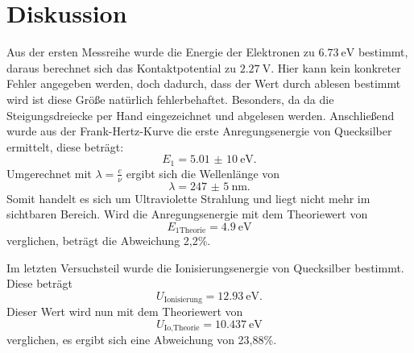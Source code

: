 \section{Diskussion}
\label{sec:Diskussion}
Aus der ersten Messreihe wurde die Energie der Elektronen zu
$\SI{6,73}{\eV}$ bestimmt, daraus berechnet sich das
Kontaktpotential zu $\SI{2,27}{\V}$.
Hier kann kein konkreter Fehler angegeben werden, doch dadurch, dass der Wert durch
ablesen bestimmt wird ist diese Größe natürlich fehlerbehaftet. Besonders, da
da die Steigungsdreiecke per Hand eingezeichnet und abgelesen werden.
Anschließend wurde aus der Frank-Hertz-Kurve die erste Anregungsenergie
von Quecksilber ermittelt, diese
beträgt:
\begin{equation}
  E_1=\SI{5,01(10)}{\eV}.
\end{equation}
Umgerechnet mit $\lambda=\frac{c}{\nu}$ ergibt sich die Wellenlänge von
\begin{equation}
  \lambda=\SI{247(5)}{\nm}.
\end{equation}
Somit handelt es sich um Ultraviolette Strahlung und liegt nicht mehr im sichtbaren Bereich.
Wird die Anregungsenergie mit dem Theoriewert von
\begin{equation}
  E_{1\text{Theorie}}=\SI{4,9}{\eV}
\end{equation}
\cite{anregung}
verglichen, beträgt die Abweichung 2,2\%.

Im letzten Versuchsteil wurde die Ionisierungsenergie von Quecksilber
bestimmt. Diese beträgt
\begin{equation}
  U_{\text{Ionisierung}}=\SI{12,93}{\eV}.
\end{equation}
Dieser Wert wird nun mit dem Theoriewert von
\begin{equation}
  U_{\text{Io,Theorie}}=\SI{10,437}{\eV}
\end{equation}
\cite{ionisierung}
verglichen, es ergibt sich eine Abweichung von 23,88\%.
